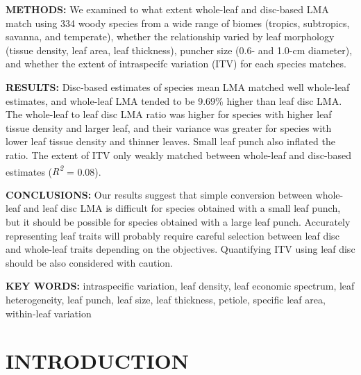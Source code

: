 \documentclass[
  12pt,
  a4paper,
,tablecaptionabove
]{scrartcl}
\begin{document}
\textbf{METHODS:}
We examined to what extent whole-leaf and disc-based LMA match using 334 woody species from a wide range of biomes (tropics, subtropics, savanna, and temperate),
whether the relationship varied by leaf morphology (tissue density, leaf area, leaf thickness), puncher size (0.6- and 1.0-cm diameter), and
whether the extent of intraspecifc variation (ITV) for each species matches.

\textbf{RESULTS:}
Disc-based estimates of species mean LMA matched well whole-leaf estimates, and whole-leaf LMA tended to be 9.69\% higher than leaf disc LMA.
The whole-leaf to leaf disc LMA ratio was higher for species with higher leaf tissue density and larger leaf, and their variance was greater for species with lower leaf tissue density and thinner leaves.
Small leaf punch also inflated the ratio.
The extent of ITV only weakly matched between whole-leaf and disc-based estimates (\emph{R\textsuperscript{2}} = 0.08).

\textbf{CONCLUSIONS:}
Our results suggest that simple conversion between whole-leaf and leaf disc LMA is difficult for species obtained with a small leaf punch, but it should be possible for species obtained with a large leaf punch.
Accurately representing leaf traits will probably require careful selection between leaf disc and whole-leaf traits depending on the objectives.
Quantifying ITV using leaf disc should be also considered with caution.

\textbf{KEY WORDS:}
intraspecific variation,
leaf density,
leaf economic spectrum,
leaf heterogeneity,
leaf punch,
leaf size,
leaf thickness,
petiole,
specific leaf area,
within-leaf variation

\hypertarget{introduction}{%
\section{INTRODUCTION}\label{introduction}}
\end{document}
